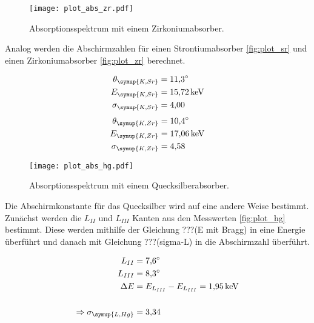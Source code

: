 \begin{figure}[H]
  \centering
  \texttt{[image: plot\_abs\_zr.pdf]}
  \caption{Absorptionsspektrum mit einem Zirkoniumabsorber.}
  \label{fig:plot_zr}
\end{figure}

Analog werden die Abschirmzahlen für einen Strontiumabsorber \eqref{fig:plot_sr} und einen
Zirkoniumabsorber \eqref{fig:plot_zr} berechnet.

\begin{align*}
  \theta_\symup{K,Sr} &= \SI{11.3}{\degree}\\
  E_\symup{K,Sr} &= \SI{15.72}{\kilo\eV}\\
  \sigma_\symup{K,Sr} &= \num{4.00}\\
\end{align*}
\begin{align*}
  \theta_\symup{K,Zr} &= \SI{10.4}{\degree}\\
  E_\symup{K,Zr} &= \SI{17.06}{\kilo\eV}\\
  \sigma_\symup{K,Zr} &=\num{4.58}\\
\end{align*}


\begin{figure}[H]
  \centering
  \texttt{[image: plot\_abs\_hg.pdf]}
  \caption{Absorptionsspektrum mit einem Quecksilberabsorber.}
  \label{fig:plot_hg}
\end{figure}

Die Abschirmkonstante für das Quecksilber wird auf eine andere Weise bestimmt. Zunächst
werden die $L_{II}$ und $L_{III}$ Kanten aus den Messwerten \eqref{fig:plot_hg} bestimmt.
Diese werden mithilfe der Gleichung ???(E mit Bragg) in eine Energie überführt und danach
mit Gleichung ???(sigma-L) in die Abschirmzahl überführt.

\begin{align*}
  L_{II} &= \SI{7.6}{\degree}\\
  L_{III}&= \SI{8.3}{\degree}\\
  \Delta E &= E_{L_{III}}-E_{L_{III}} = \SI{1.95}{\kilo\eV}\\\\
  \Rightarrow \sigma_\symup{L,Hg} &= \num{3.34}\\
\end{align*}
